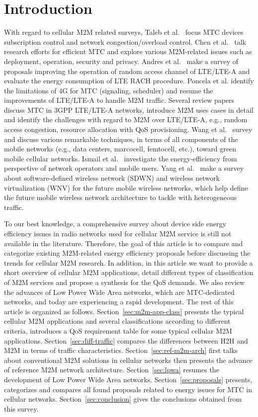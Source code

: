 \section{Introduction}


With regard to cellular M2M related surveys, Taleb et al.~\cite{journals/cm/TalebK12} focus MTC devices subscription control and network congestion/overload control. Chen et al.~\cite{chen2014machine} talk research efforts for efficient MTC and explore various M2M-related issues such as deployment, operation, security and privacy. Andres et al.~\cite{laya14} make a survey of proposals improving the operation of random access channel of LTE/LTE-A and evaluate the energy consumption of LTE RACH procedure. Poncela et al. \cite{poncela2015m2m} identify the limitations of 4G for MTC (signaling, scheduler) and resume the improvements of LTE/LTE-A to handle M2M traffic. Several review papers~\cite{GhavimiF2015}\cite{mehmood2015mobile} discuss MTC in 3GPP LTE/LTE-A networks, introduce M2M uses cases in detail and identify the challenges with regard to M2M over LTE/LTE-A, e.g., random access congestion, resource allocation with QoS provisioning. Wang et al.~\cite{wang2012survey} survey and discuss various remarkable techniques, in terms of all components of the mobile networks (e.g., data centers, marcocell, femtocell, etc.), toward green mobile cellular networks. Ismail et al.~\cite{ismail2014survey} investigate the energy-efficiency from perspective of network operators and mobile users. Yang et al.~\cite{yang2015software} make a survey about software-defined wireless network (SDWN) and wireless network virtualization (WNV) for the future mobile wireless networks, which help define the future mobile wireless network architecture to tackle with heterogeneous traffic.

To our best knowledge, a comprehensive survey about device side energy efficiency issues in radio networks used for cellular M2M service is still not available in the literature. Therefore, the goal of this article is to compare and categorize existing M2M-related energy efficiency proposals before discussing the trends for cellular M2M research. In addition, in this article we want to provide a short overview of cellular M2M applications, detail different types of classification of M2M services and propose a synthesis for the QoS demands. We also review the advances of Low Power Wide Area networks, which are MTC-dedicated networks, and today are experiencing a rapid development. The rest of this article is organized as follows. Section~\ref{sec:m2m-app-class} presents the typical cellular M2M applications and several classifications according to different criteria, introduces a QoS requirement table for some typical cellular M2M applications. Section~\ref{sec:diff-traffic} compares the differences between H2H and M2M in terms of traffic characteristics. Section~\ref{sec:ref-m2m-arch} first talks about conventional M2M solutions in cellular networks then presents the advance of reference M2M network architecture. Section~\ref{sec:lpwa} resumes the development of Low Power Wide Area networks. Section~\ref{sec:proposals} presents, categorizes and compares all found proposals related to energy issues for MTC in cellular networks. Section~\ref{sec:conclusion} gives the conclusions obtained from this survey.